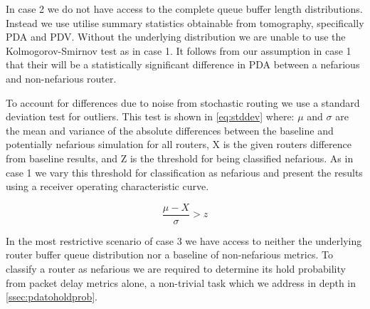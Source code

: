   In case 2 we do not have access to the complete queue buffer length distributions. Instead we use utilise summary statistics obtainable from tomography, specifically PDA and PDV. Without the underlying distribution we are unable to use the Kolmogorov-Smirnov test as in case 1. It follows from our assumption in case 1 that their will be a statistically significant difference in PDA between a nefarious and non-nefarious router.\par
  To account for differences due to noise from stochastic routing we use a standard deviation test for outliers. This test is shown in \cref{eq:stddev} where: $\mu$ and $\sigma$ are the mean and variance of the absolute differences between the baseline and potentially nefarious simulation for all routers, X is the given routers difference from baseline results, and Z is the threshold for being classified nefarious. As in case 1 we vary this threshold for classification as nefarious and present the results using a receiver operating characteristic curve.\par
  
  \begin{equation}
  \label{eq:stddev}
      \frac{\mu-X}{\sigma}>z
  \end{equation}
  
  In the most restrictive scenario of case 3 we have access to neither the underlying router buffer queue distribution nor a baseline of non-nefarious metrics. To classify a router as nefarious we are required to determine its hold probability from packet delay metrics alone, a non-trivial task which we address in depth in \cref{ssec:pdatoholdprob}.\par
  
